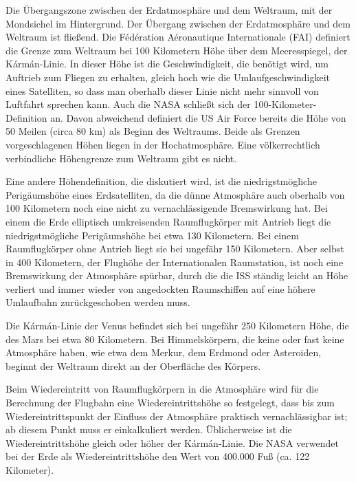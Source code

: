 {Die Übergangszone zwischen der Erdatmosphäre und dem Weltraum, mit der Mondsichel im Hintergrund.
Der Übergang zwischen der Erdatmosphäre und dem Weltraum ist fließend.
Die Fédération Aéronautique Internationale (FAI) definiert die Grenze zum Weltraum bei 100 Kilometern Höhe über dem Meeresspiegel, der Kármán-Linie.
In dieser Höhe ist die Geschwindigkeit, die benötigt wird, um Auftrieb zum Fliegen zu erhalten, gleich hoch wie die Umlaufgeschwindigkeit eines Satelliten, so dass man oberhalb dieser Linie nicht mehr sinnvoll von Luftfahrt sprechen kann.
Auch die NASA schließt sich der 100-Kilometer-Definition an.
Davon abweichend definiert die US Air Force bereits die Höhe von 50 Meilen (circa 80 km) als Beginn des Weltraums.
Beide als Grenzen vorgeschlagenen Höhen liegen in der Hochatmosphäre.
Eine völkerrechtlich verbindliche Höhengrenze zum Weltraum gibt es nicht.

Eine andere Höhendefinition, die diskutiert wird, ist die niedrigstmögliche Perigäumshöhe eines Erdsatelliten, da die dünne Atmosphäre auch oberhalb von 100 Kilometern noch eine nicht zu vernachlässigende Bremswirkung hat.
Bei einem die Erde elliptisch umkreisenden Raumflugkörper mit Antrieb liegt die niedrigstmögliche Perigäumshöhe bei etwa 130 Kilometern.
Bei einem Raumflugkörper ohne Antrieb liegt sie bei ungefähr 150 Kilometern.
Aber selbst in 400 Kilometern, der Flughöhe der Internationalen Raumstation, ist noch eine Bremswirkung der Atmosphäre spürbar, durch die die ISS ständig leicht an Höhe verliert und immer wieder von angedockten Raumschiffen auf eine höhere Umlaufbahn zurückgeschoben werden muss.

Die Kármán-Linie der Venus befindet sich bei ungefähr 250 Kilometern Höhe, die des Mars bei etwa 80 Kilometern.
Bei Himmelskörpern, die keine oder fast keine Atmosphäre haben, wie etwa dem Merkur, dem Erdmond oder Asteroiden, beginnt der Weltraum direkt an der Oberfläche des Körpers.

Beim Wiedereintritt von Raumflugkörpern in die Atmosphäre wird für die Berechnung der Flugbahn eine Wiedereintrittshöhe so festgelegt, dass bis zum Wiedereintrittspunkt der Einfluss der Atmosphäre praktisch vernachlässigbar ist; ab diesem Punkt muss er einkalkuliert werden.
Üblicherweise ist die Wiedereintrittshöhe gleich oder höher der Kármán-Linie.
Die NASA verwendet bei der Erde als Wiedereintrittshöhe den Wert von 400.000 Fuß (ca. 122 Kilometer).

}



